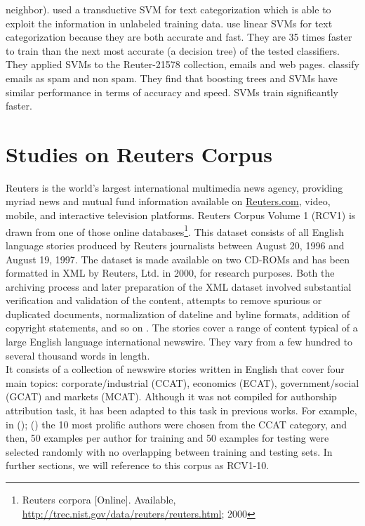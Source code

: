 neighbor). \citeauthor{joachims1999transductive} \cite{joachims1999transductive} used a transductive SVM for text categorization which is able to exploit the information in unlabeled training data.
\citeauthor{dumais1998inductive} \cite{dumais1998inductive} use linear SVMs for text categorization because they are both accurate and fast. They are 35 times faster to train than the next most accurate (a decision tree) of the tested classifiers. They applied SVMs to the Reuter-21578 collection, emails and web pages.
\citeauthor{drucker1999support} \cite{drucker1999support} classify emails as spam and non spam. They find that boosting trees and SVMs have similar performance in terms of accuracy and speed. SVMs train significantly faster.

\section{Studies on Reuters Corpus}
Reuters is the world’s largest international multimedia news agency, providing myriad news and mutual fund information available on \url{Reuters.com}, video, mobile, and interactive television platforms. Reuters Corpus Volume 1 (RCV1) is drawn from one of those online databases\footnote{Reuters corpora [Online]. Available, \url{http://trec.nist.gov/data/reuters/reuters.html}; 2000}. This dataset consists of all English language stories produced by Reuters journalists between August 20, 1996 and August 19, 1997. The dataset is made available on two CD-ROMs and has been formatted in XML by Reuters, Ltd. in 2000, for research purposes. Both the archiving process and later preparation of
the XML dataset involved substantial verification and validation of the content, attempts to remove spurious or duplicated documents, normalization of dateline and byline formats, addition of copyright statements, and so on \cite{cheng2011author}. The stories cover a range of content typical of a large English language international newswire. They vary from a few hundred to several thousand words in length.\\
It consists of a collection of newswire stories written in English that cover four main topics: corporate/industrial (CCAT), economics (ECAT), government/social (GCAT) and markets (MCAT).
Although it was not compiled for authorship attribution task, it has been adapted to this task in previous works. For example, in \citeauthor{stamatatos2008author} (\citeyear{stamatatos2008author}); \citeauthor{plakias2008tensor} (\citeyear{plakias2008tensor}) the 10 most prolific authors were chosen from the CCAT category, and then, 50 examples per author for training and 50 examples for testing were selected randomly with no overlapping between training and testing sets. In further sections, we will reference to this corpus as RCV1-10.\\
